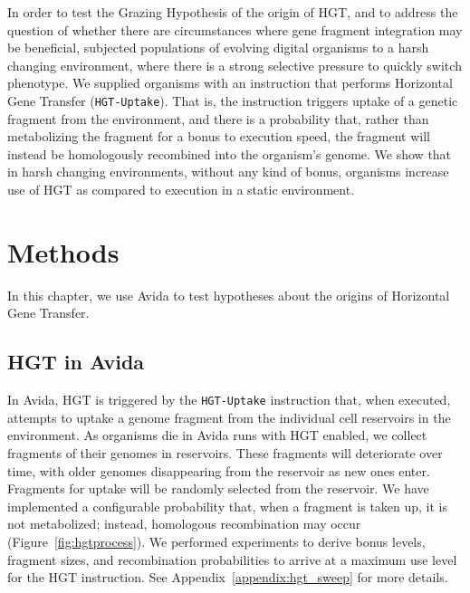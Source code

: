 \documentclass[letterpaper]{article}
\begin{document}
In order to test the Grazing Hypothesis of the origin of HGT, and to address the question of whether there are circumstances where gene fragment integration may be beneficial, subjected populations of evolving digital organisms to a harsh changing environment,
where there is a strong selective pressure to quickly switch phenotype. We supplied organisms with an instruction that performs Horizontal Gene Transfer (\texttt{HGT-Uptake}). That is, the instruction triggers uptake of a genetic fragment from the environment, and there is a probability that, rather than metabolizing the fragment for a bonus to execution speed, the fragment will instead be homologously recombined into the organism's genome. We show that in harsh changing environments, without any kind of bonus, organisms increase use of HGT as compared to execution in a static environment.

\section{Methods}

In this chapter, we use Avida to test hypotheses about the origins of Horizontal Gene Transfer. 

\subsection{HGT in Avida}
In Avida, HGT is triggered by the \texttt{HGT-Uptake} instruction that, when executed, attempts to uptake a genome fragment from the individual cell reservoirs in the environment. As organisms die in Avida runs with HGT enabled, we collect fragments of their genomes in reservoirs. These fragments will deteriorate over time, with older genomes disappearing from the reservoir as new ones enter. Fragments for uptake will be randomly selected from the reservoir.  
We have implemented a configurable probability that, when a fragment is taken up, it is not metabolized; instead, homologous recombination may occur (Figure~\ref{fig:hgtprocess}). We performed experiments to derive bonus levels, fragment sizes, and recombination probabilities to arrive at a maximum use level for the HGT instruction. See Appendix~\ref{appendix:hgt_sweep} for more details. 
\end{document}
